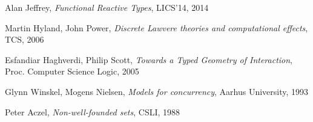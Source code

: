 \documentclass{article}
\begin{document}
\begin{thebibliography}{99}
    Alan Jeffrey,
    \emph{Functional Reactive Types},
    LICS'14,
    2014

    Martin Hyland, John Power,
    \emph{Discrete Lawvere theories and computational effects},
    TCS,
    2006

    Esfandiar Haghverdi, Philip Scott,
    \emph{Towards a Typed Geometry of Interaction},
    Proc. Computer Science Logic,
    2005

    Glynn Winskel, Mogens Nielsen,
    \emph{Models for concurrency},
    Aarhus University,
    1993

    Peter Aczel,
    \emph{Non-well-founded sets},
    CSLI,
    1988

\end{thebibliography}

\end{document}
